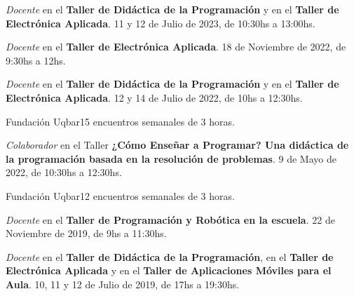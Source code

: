 \begin{enumerate}[leftmargin=0.8cm]
{\begin{itemize}[leftmargin=0.2cm]
      {\emph{Docente} en el \textbf{Taller de Didáctica de la Programación} y en el \textbf{Taller de Electrónica Aplicada}.}
      {11 y 12 de Julio de 2023, de 10:30hs a 13:00hs.}

      {\emph{Docente} en el \textbf{Taller de Electrónica Aplicada}.}
      {18 de Noviembre de 2022, de 9:30hs a 12hs.}

      {\emph{Docente} en el \textbf{Taller de Didáctica de la Programación} y en el \textbf{Taller de Electrónica Aplicada}.}
      {12 y 14 de Julio de 2022, de 10hs a 12:30hs.}

      {Fundación Uqbar}{15 encuentros semanales de 3 horas.}

      {\emph{Colaborador} en el Taller \textbf{¿Cómo Enseñar a Programar? Una didáctica de la programación basada en la resolución de problemas}.}
      {9 de Mayo de 2022, de 10:30hs a 12:30hs.}

      {Fundación Uqbar}{12 encuentros semanales de 3 horas.}

      {\emph{Docente} en el \textbf{Taller de Programación y Robótica en la escuela}.}
      {22 de Noviembre de 2019, de 9hs a 11:30hs.}

      {\emph{Docente} en el \textbf{Taller de Didáctica de la Programación}, en el \textbf{Taller de Electrónica Aplicada} y
        en el \textbf{Taller de Aplicaciones Móviles para el Aula}.}
      {10, 11 y 12 de Julio de 2019, de 17hs a 19:30hs.}


\end{itemize}}
\end{enumerate}
